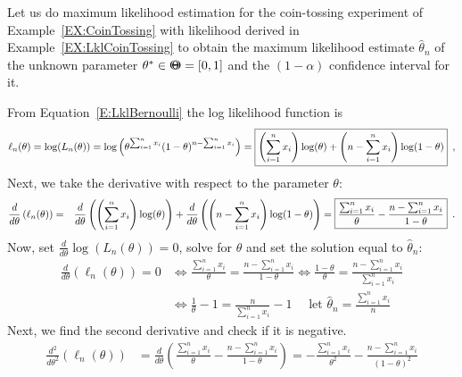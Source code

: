 \begin{example}\label{EX:MLECoinTossing}
Let us do maximum likelihood estimation for the coin-tossing experiment of Example~\ref{EX:CoinTossing} with likelihood derived in Example~\ref{EX:LklCoinTossing} to obtain the maximum likelihood estimate $\widehat{\theta}_n$ of the unknown parameter $\theta^* \in {\Theta}\mspace{-11 mu}{\Theta} = [0,1]$ and the $(1-\alpha)$ confidence interval for it.

From Equation~\eqref{E:LklBernoulli} the log likelihood function is
\begin{eqnarray}
\ell_n(\theta) = \log(L_n(\theta)) 
= \log \left( \theta^{\sum_{i=1}^n x_i} (1-\theta)^ {n-\sum_{i=1}^n x_i} \right) 
= \boxed{\left({\sum_{i=1}^n x_i}\right) \log(\theta) + \left(n-{\sum_{i=1}^n x_i}\right) \log(1-\theta)} \notag \enspace ,
\end{eqnarray}
Next, we take the derivative with respect to the parameter $\theta$:
\begin{eqnarray}
\frac{d}{d \theta} \left(\ell_n(\theta)\right) 
&=& \frac{d}{d \theta}  \left( \left({\sum_{i=1}^n x_i}\right) \log(\theta) \right) + \frac{d}{d \theta} \left(  \left( n-{\sum_{i=1}^n x_i} \right) \log(1-\theta) \right) \notag = \boxed{\frac{{\sum_{i=1}^n x_i}}{\theta} - \frac{n-{\sum_{i=1}^n x_i}}{1-\theta}} \notag \enspace .
\end{eqnarray}
Now, set $\frac{d}{d \theta} \log(L_n(\theta))=0$, solve for $\theta$ and set the solution equal to $\widehat{\theta}_n$: 
\begin{align*}
\frac{d}{d \theta} \left( \ell_n(\theta) \right) = 0 
&\iff  \frac{{\sum_{i=1}^n x_i}}{\theta} = \frac{n-{\sum_{i=1}^n x_i}}{1-\theta} \iff
\frac{1-\theta}{\theta} = \frac{n-{\sum_{i=1}^n x_i}}{{\sum_{i=1}^n x_i}} \\
&\iff
\frac{1}{\theta}-1 = \frac{n}{{\sum_{i=1}^n x_i}}-1 \quad \text{ let } \boxed{\widehat{\theta}_n = \frac{{\sum_{i=1}^n x_i}}{n}}
\end{align*}
Next, we find the second derivative and check if it is negative.
\begin{align*}
\frac{d^2}{d \theta^2} (\ell_n(\theta)) 
&= \frac{d}{d \theta} \left( \frac{{\sum_{i=1}^n x_i}}{\theta} - \frac{n-{\sum_{i=1}^n x_i}}{1-\theta} \right) 
= \boxed{-\frac{{\sum_{i=1}^n x_i}}{\theta^2} - \frac{n-{\sum_{i=1}^n x_i}}{(1-\theta)^2}} 
\end{align*}


\end{example}
